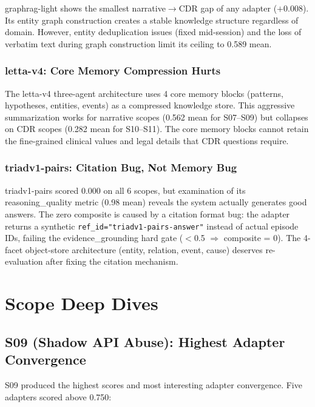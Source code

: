 \documentclass[11pt,letterpaper]{article}
\begin{document}
graphrag-light shows the smallest narrative$\to$CDR gap of any adapter ($+$0.008). Its entity graph construction creates a stable knowledge structure regardless of domain. However, entity deduplication issues (fixed mid-session) and the loss of verbatim text during graph construction limit its ceiling to 0.589 mean.

\subsubsection{letta-v4: Core Memory Compression Hurts}

The letta-v4 three-agent architecture uses 4 core memory blocks (patterns, hypotheses, entities, events) as a compressed knowledge store. This aggressive summarization works for narrative scopes (0.562 mean for S07--S09) but collapses on CDR scopes (0.282 mean for S10--S11). The core memory blocks cannot retain the fine-grained clinical values and legal details that CDR questions require.

\subsubsection{triadv1-pairs: Citation Bug, Not Memory Bug}

triadv1-pairs scored 0.000 on all 6 scopes, but examination of its reasoning\_quality metric (0.98 mean) reveals the system actually generates good answers. The zero composite is caused by a citation format bug: the adapter returns a synthetic \texttt{ref\_id="triadv1-pairs-answer"} instead of actual episode IDs, failing the evidence\_grounding hard gate ($<$0.5 $\Rightarrow$ composite = 0). The 4-facet object-store architecture (entity, relation, event, cause) deserves re-evaluation after fixing the citation mechanism.

\section{Scope Deep Dives}
\label{sec:deep-dives}

\subsection{S09 (Shadow API Abuse): Highest Adapter Convergence}

S09 produced the highest scores and most interesting adapter convergence. Five adapters scored above 0.750:
\end{document}
